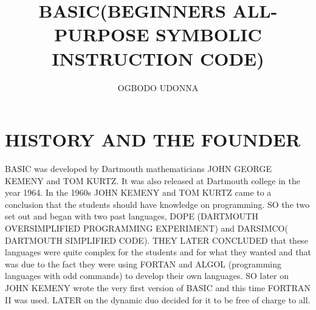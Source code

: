 \documentclass{article}
\title{BASIC(BEGINNERS ALL-PURPOSE SYMBOLIC INSTRUCTION CODE)}
\author{OGBODO UDONNA}
\begin{document}
	\section{HISTORY AND THE FOUNDER}
	BASIC was developed by Dartmouth mathematicians JOHN GEORGE KEMENY and TOM KURTZ.
	It was also released at Dartmouth college in the year 1964.
	In the 1960s JOHN KEMENY and TOM KURTZ came to a conclusion that the students should have knowledge on programming.
	SO the two set out and began with two past languages, DOPE (DARTMOUTH OVERSIMPLIFIED PROGRAMMING EXPERIMENT) and DARSIMCO( DARTMOUTH SIMPLIFIED CODE).
	THEY LATER CONCLUDED that these languages were quite complex for the students and for what they wanted and that was due to the fact they were using FORTAN and ALGOL (programming languages with odd commands) to develop their own languages.
	SO later on JOHN KEMENY wrote the very first version of BASIC and this time FORTRAN II was used.
	LATER on the dynamic duo decided for it to be free of charge to all.
\end{document}
